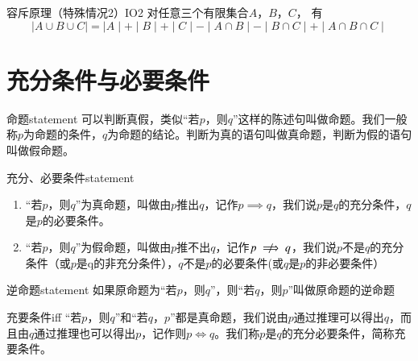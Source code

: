 \begin{theorem}{容斥原理（特殊情况2）}{IO2}
对任意三个有限集合$A$，$B$，$C$， 有
\begin{equation}
\mid A \cup B \cup C \mid = \mid A \mid + \mid B \mid + \mid C \mid - \mid A \cap B \mid - \mid B \cap C \mid + \mid A \cap B \cap C \mid
\end{equation}
\end{theorem}


\section{充分条件与必要条件}

\begin{definition}{命题}{statement}
\textcolor{third}{可以判断真假}，类似“若$p$，则$q$”这样的\textcolor{third}{陈述句}叫做\textcolor{third}{命题}。我们一般称$p$为命题的条件，$q$为命题的结论。判断为真的语句叫做真命题，判断为假的语句叫做假命题。
\end{definition}

\begin{definition}{充分、必要条件}{statement}
	\begin{enumerate}
		\item “若$p$，则$q$”为真命题，叫做由$p$推出$q$，记作$p \implies q$，我们说$p$是$q$的充分条件，$q$是$p$的必要条件。
		\item “若$p$，则$q$”为假命题，叫做由$p$推不出$q$，记作$p \centernot\implies q$，我们说$p$不是$q$的充分条件（或$p$是q的非充分条件），$q$不是$p$的必要条件(或$q$是$p$的非必要条件）
	\end{enumerate}
\end{definition}

\begin{definition}{逆命题}{statement}
如果原命题为“若$p$，则$q$”，则“若$q$，则$p$”叫做原命题的\textcolor{third}{逆命题}
\end{definition}

\begin{definition}{充要条件}{iff}
“若$p$，则$q$”和“若$q$，$p$”都是真命题，我们说由$p$通过推理可以得出$q$，而且由$q$通过推理也可以得出$p$，记作则$p \iff q$。我们称$p$是$q$的充分必要条件，简称充要条件。
\end{definition}

